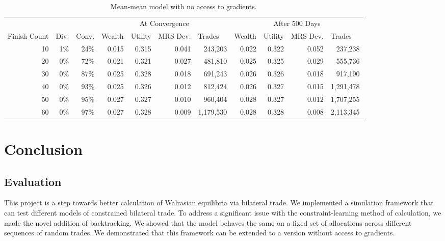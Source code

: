 \documentclass[12pt,a4paper,titlepage]{article}
\newcommand{\co}[1]{\textsf{#1}}
\begin{document}
\begin{sidewaystable}
  \begin{tabular}{r|rr|rrrr|rrrr}
    
    & \multicolumn{1}{|l}{} & \multicolumn{1}{l}{} & \multicolumn{ 4}{|c|}{At Convergence} & \multicolumn{ 4}{c}{After 500 Days} \\ 
    Finish Count & \multicolumn{1}{|l}{Div.} & \multicolumn{1}{l}{Conv.} & \multicolumn{1}{|l}{Wealth} & \multicolumn{1}{l}{Utility} & \multicolumn{1}{l}{MRS Dev.} & \multicolumn{1}{l}{Trades} & \multicolumn{1}{|l}{Wealth} & \multicolumn{1}{l}{Utility} & \multicolumn{1}{l}{MRS Dev.} & \multicolumn{1}{l}{Trades} \\ 
    \hline
    10 & 1\% & 24\% & 0.015 & 0.315 & 0.041 & 243,203   & 0.022 & 0.322 & 0.052 & 237,238 \\
    20 & 0\% & 72\% & 0.021 & 0.321 & 0.027 & 481,810   & 0.025 & 0.325 & 0.029 & 555,736 \\
    30 & 0\% & 87\% & 0.025 & 0.328 & 0.018 & 691,243   & 0.026 & 0.326 & 0.018 & 917,190 \\
    40 & 0\% & 93\% & 0.025 & 0.326 & 0.012 & 812,424   & 0.026 & 0.327 & 0.015 & 1,291,478 \\
    50 & 0\% & 95\% & 0.027 & 0.327 & 0.010 & 960,404   & 0.028 & 0.327 & 0.012 & 1,707,255 \\
    60 & 0\% & 97\% & 0.027 & 0.328 & 0.009 & 1,179,530 & 0.028 & 0.328 & 0.008 & 2,113,345 \\
  \end{tabular}
  \caption{\co{Mean}-\co{mean} model with no access to gradients.}
  \label{tab:ut}
\end{sidewaystable}

\clearpage

\section{Conclusion}\label{conclusion}

\subsection{Evaluation}
This project is a step towards better calculation of Walrasian equilibria via bilateral trade.
We implemented a simulation framework that can test different models of constrained bilateral trade.
To address a significant issue with the constraint-learning method of calculation, we made the novel addition of backtracking.
We showed that the model behaves the same on a fixed set of allocations across different sequences of random trades.
We demonstrated that this framework can be extended to a version without access to gradients.
\end{document}
